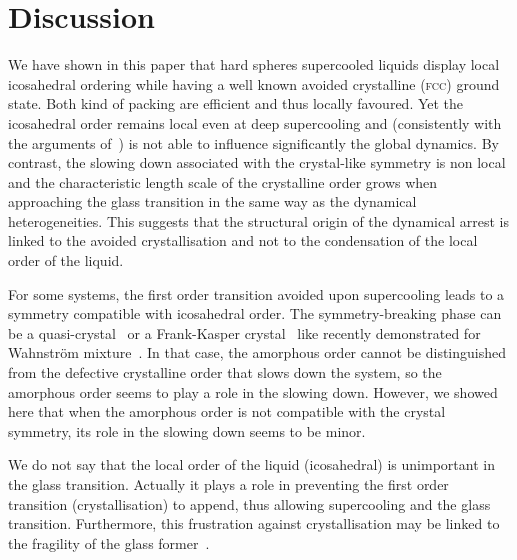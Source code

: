 \documentclass[11pt,a4paper]{article}
\begin{document}
\section*{Discussion}

We have shown in this paper that hard spheres supercooled liquids display local icosahedral ordering while having a well known avoided crystalline (\textsc{fcc}) ground state. Both kind of packing are efficient and thus locally favoured. Yet the icosahedral order remains local even at deep supercooling and (consistently with the arguments of~\citep{Berthier2007}) is not able to influence significantly the global dynamics. By contrast, the slowing down associated with the crystal-like symmetry is non local and the characteristic length scale of the crystalline order grows when approaching the glass transition in the same way as the dynamical heterogeneities. This suggests that the structural origin of the dynamical arrest is linked to the avoided crystallisation and not to the condensation of the local order of the liquid.

For some systems, the first order transition avoided upon supercooling leads to a symmetry compatible with icosahedral order. The symmetry-breaking phase can be a quasi-crystal~\citep{Dzugutov1993} or a Frank-Kasper crystal~\citep{Frank1959,Frank1958} like recently demonstrated for Wahnstr\"om mixture~\citep{Pedersen2010}. In that case, the amorphous order cannot be distinguished from the defective crystalline order that slows down the system, so the amorphous order seems to play a role in the slowing down. However, we showed here that when the amorphous order is not compatible with the crystal symmetry, its role in the slowing down seems to be minor.

We do not say that the local order of the liquid (icosahedral) is unimportant in the glass transition. Actually it plays a role in preventing the first order transition (crystallisation) to append, thus allowing supercooling and the glass transition. Furthermore, this frustration against crystallisation may be linked to the fragility of the glass former~\citep{tanaka1999top}.



\end{document}
